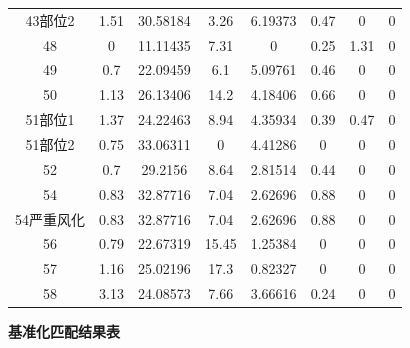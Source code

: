 \documentclass[withoutpreface,bwprint]{cumcmthesis} %
\begin{document}
\begin{appendices}
\begin{table}[H]
\begin{tabular}{cccccccc}
    43部位2  & 1.51  & 30.58184 & 3.26  & 6.19373  & 0.47 & 0    & 0    \\
    48     & 0     & 11.11435 & 7.31  & 0        & 0.25 & 1.31 & 0    \\
    49     & 0.7   & 22.09459 & 6.1   & 5.09761  & 0.46 & 0    & 0    \\
    50     & 1.13  & 26.13406 & 14.2  & 4.18406  & 0.66 & 0    & 0    \\
    51部位1  & 1.37  & 24.22463 & 8.94  & 4.35934  & 0.39 & 0.47 & 0    \\
    51部位2  & 0.75  & 33.06311 & 0     & 4.41286  & 0    & 0    & 0    \\
    52     & 0.7   & 29.2156  & 8.64  & 2.81514  & 0.44 & 0    & 0    \\
    54     & 0.83  & 32.87716 & 7.04  & 2.62696  & 0.88 & 0    & 0    \\
    54严重风化 & 0.83  & 32.87716 & 7.04  & 2.62696  & 0.88 & 0    & 0    \\
    56     & 0.79  & 22.67319 & 15.45 & 1.25384  & 0    & 0    & 0    \\
    57     & 1.16  & 25.02196 & 17.3  & 0.82327  & 0    & 0    & 0    \\
    58     & 3.13  & 24.08573 & 7.66  & 3.66616  & 0.24 & 0    & 0    \\ \bottomrule[1.5pt]
  \end{tabular}
\end{table}

\newpage
\textbf{基准化匹配结果表}


\end{appendices}
\end{document}
